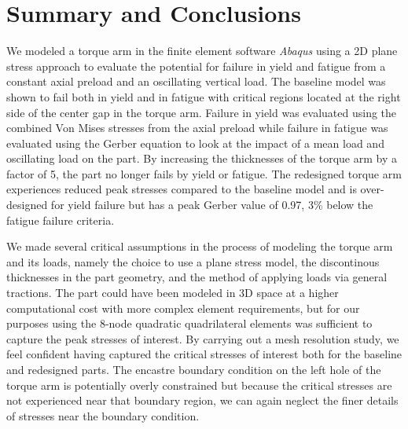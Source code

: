 \documentclass[../main.tex]{subfiles}
\begin{document}
\section{Summary and Conclusions}

We modeled a torque arm in the finite element software \textit{Abaqus} using a 2D plane stress approach to evaluate the potential for failure in yield and fatigue from a constant axial preload and an oscillating vertical load.
The baseline model was shown to fail both in yield and in fatigue with critical regions located at the right side of the center gap in the torque arm.
Failure in yield was evaluated using the combined Von Mises stresses from the axial preload while failure in fatigue was evaluated using the Gerber equation to look at the impact of a mean load and oscillating load on the part.
By increasing the thicknesses of the torque arm by a factor of 5, the part no longer fails by yield or fatigue.
The redesigned torque arm experiences reduced peak stresses compared to the baseline model and is over-designed for yield failure but has a peak Gerber value of 0.97, 3\% below the fatigue failure criteria.

We made several critical assumptions in the process of modeling the torque arm and its loads, namely the choice to use a plane stress model, the discontinous thicknesses in the part geometry, and the method of applying loads via general tractions.
The part could have been modeled in 3D space at a higher computational cost with more complex element requirements, but for our purposes using the 8-node quadratic quadrilateral elements was sufficient to capture the peak stresses of interest.
By carrying out a mesh resolution study, we feel confident having captured the critical stresses of interest both for the baseline and redesigned parts.
The encastre boundary condition on the left hole of the torque arm is potentially overly constrained but because the critical stresses are not experienced near that boundary region, we can again neglect the finer details of stresses near the boundary condition.
\end{document}
